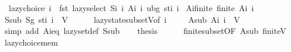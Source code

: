 \begin{isabellebody}
\ \ {\isachardoublequoteopen}lazy{\isacharunderscore}{\kern0pt}choice\ i\ {\isacharequal}{\kern0pt}\ fst\ {\isacharparenleft}{\kern0pt}lazy{\isacharunderscore}{\kern0pt}select\ {\isacharparenleft}{\kern0pt}S{\isacharunderscore}{\kern0pt}i\ i{\isacharparenright}{\kern0pt}\ {\isacharparenleft}{\kern0pt}A{\isacharunderscore}{\kern0pt}i\ i{\isacharparenright}{\kern0pt}\ {\isacharparenleft}{\kern0pt}ubg\ {\isacharparenleft}{\kern0pt}st{\isacharunderscore}{\kern0pt}i\ i{\isacharparenright}{\kern0pt}{\isacharparenright}{\kern0pt}{\isacharparenright}{\kern0pt}{\isachardoublequoteclose}\isanewline
\isanewline
{}\isamarkupfalse%
\ A{\isacharunderscore}{\kern0pt}i{\isacharunderscore}{\kern0pt}finite{\isacharcolon}{\kern0pt}\ {\isachardoublequoteopen}finite\ {\isacharparenleft}{\kern0pt}A{\isacharunderscore}{\kern0pt}i\ i{\isacharparenright}{\kern0pt}{\isachardoublequoteclose}\isanewline
%
\isadelimproof
%
\endisadelimproof
%
\isatagproof
{}\isamarkupfalse%
\ {\isacharminus}{\kern0pt}\isanewline
\ \ \isamarkupfalse%
\ Ssub{\isacharcolon}{\kern0pt}\ {\isachardoublequoteopen}Sg\ {\isacharparenleft}{\kern0pt}st{\isacharunderscore}{\kern0pt}i\ i{\isacharparenright}{\kern0pt}\ {\isasymsubseteq}\ V{\isachardoublequoteclose}\isanewline
\ \ \ \ \isamarkupfalse%
\ lazy{\isacharunderscore}{\kern0pt}state{\isacharunderscore}{\kern0pt}subset{\isacharunderscore}{\kern0pt}V{\isacharbrackleft}{\kern0pt}of\ i{\isacharbrackright}{\kern0pt}\ \isakeywordONE{{\isachardot}{\kern0pt}}\isamarkupfalse%
\isanewline
\ \ \isamarkupfalse%
\ Asub{\isacharcolon}{\kern0pt}\ {\isachardoublequoteopen}A{\isacharunderscore}{\kern0pt}i\ i\ {\isasymsubseteq}\ V{\isachardoublequoteclose}\isanewline
\ \ \ \ \isamarkupfalse%
\ {\isacharparenleft}{\kern0pt}simp\ add{\isacharcolon}{\kern0pt}\ A{\isacharunderscore}{\kern0pt}i{\isacharunderscore}{\kern0pt}eq\ lazy{\isacharunderscore}{\kern0pt}set{\isacharunderscore}{\kern0pt}def\ Ssub{\isacharparenright}{\kern0pt}\isanewline
\ \ \isamarkupfalse%
\ {\isacharquery}{\kern0pt}thesis\isanewline
\ \ \ \ \isamarkupfalse%
\ finite{\isacharunderscore}{\kern0pt}subset{\isacharbrackleft}{\kern0pt}OF\ Asub\ finite{\isacharunderscore}{\kern0pt}V{\isacharbrackright}{\kern0pt}\ \isakeywordONE{{\isachardot}{\kern0pt}}\isamarkupfalse%
\isanewline
{}\isamarkupfalse%
%
\endisatagproof
{\isafoldproof}%
%
\isadelimproof
\isanewline
%
\endisadelimproof
\isanewline
{}\isamarkupfalse%
\ lazy{\isacharunderscore}{\kern0pt}choice{\isacharunderscore}{\kern0pt}mem{\isacharcolon}{\kern0pt}\isanewline

\end{isabellebody}
